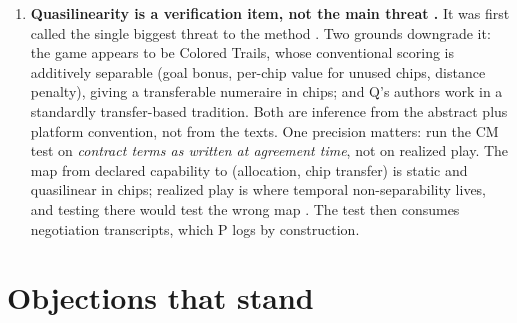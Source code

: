 \documentclass{article}
\begin{document}
\begin{enumerate}
\item \textbf{Quasilinearity is a verification item, not the main threat .} It was first called the single biggest threat to the method . Two grounds downgrade it: the game appears to be Colored Trails, whose conventional scoring is additively separable (goal bonus, per-chip value for unused chips, distance penalty), giving a transferable numeraire in chips; and Q's authors work in a standardly transfer-based tradition. Both are inference from the abstract plus platform convention, not from the texts. One precision matters: run the CM test on \emph{contract terms as written at agreement time}, not on realized play. The map from declared capability to (allocation, chip transfer) is static and quasilinear in chips; realized play is where temporal non-separability lives, and testing there would test the wrong map . The test then consumes negotiation transcripts, which P logs by construction.
\end{enumerate}

\section{Objections that stand}
\end{document}
